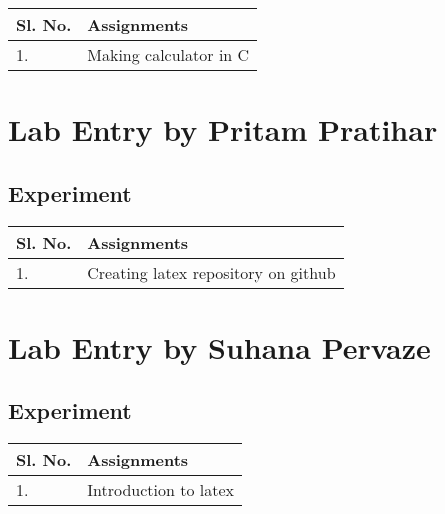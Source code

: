 \documentclass[a4paper,12pt]{article}
\begin{document}
\vspace{0.5cm}
\begin{table}[ht]
\centering
\begin{tabular}{|p{50pt}|p{200pt}|}
\hline
\textbf{Sl. No.} & \textbf{Assignments} \\ \hline
1. & Making calculator in C  \\ \hline
\end{tabular}
\end{table}

\newpage

\usetikzlibrary{calc}

\section{Lab Entry by Pritam Pratihar}
\subsection{Experiment}

\vspace{0.5cm}
\begin{table}[ht]
\centering
\begin{tabular}{|p{50pt}|p{200pt}|}
\hline
\textbf{Sl. No.} & \textbf{Assignments} \\ \hline
1. & Creating latex repository on github \\ \hline
\end{tabular}
\end{table}

\vspace{2.5cm}
\section{Lab Entry by Suhana Pervaze}
\subsection{Experiment}

\vspace{0.5cm}
\begin{table}[ht]
\centering
\begin{tabular}{|p{50pt}|p{200pt}|}
\hline
\textbf{Sl. No.} & \textbf{Assignments} \\ \hline
1. & Introduction to latex \\ \hline
\end{tabular}
\end{table}
\end{document}
